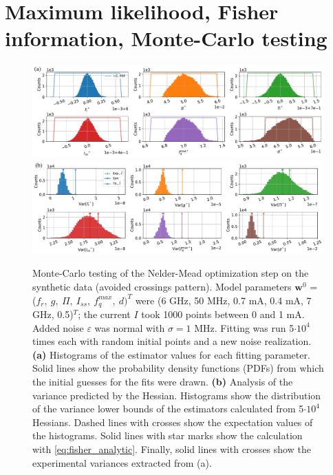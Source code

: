 \documentclass[%
 aip,
 draft,
 amsmath,amssymb,
 reprint,%
]{revtex4-1}
\begin{document}
\section{Maximum likelihood, Fisher information, Monte-Carlo testing}\label{sec:ML}

\begin{figure}
	\includegraphics[width=\linewidth]{MC-test-tr}
	\includegraphics[width=\linewidth]{MC-test-tr-H}
	\caption{Monte-Carlo testing of the Nelder-Mead optimization step on the synthetic data (avoided crossings pattern). Model parameters $\mathbf{w}^0$ = ($f_r,\ g,\ \Pi,\ I_{ss},\ f_q^{max},\ d)^T$ were (6 GHz, 50 MHz, 0.7 mA, 0.4 mA, 7 GHz, 0.5)$^T$; the current $I$ took 1000 points between 0 and 1 mA. Added noise $\varepsilon$ was normal with $\sigma=1$ MHz. Fitting was run 5$\cdot 10^4$ times each with random initial points and a new noise realization. \textbf{(a)} Histograms of the estimator values for each fitting parameter. Solid lines show the probability density functions (PDFs) from which the initial guesses for the fits were drawn. \textbf{(b)} Analysis of the variance predicted by the Hessian. Histograms show the distribution of the variance lower bounds of the estimators calculated from 5$\cdot 10^4$ Hessians. Dashed lines with crosses show the expectation values of the histograms. Solid lines with star marks show the calculation with \eqref{eq:fisher_analytic}. Finally, solid lines with crosses show the experimental variances extracted from (a).}
	\label{fig:mc-test}
\end{figure}
\end{document}
